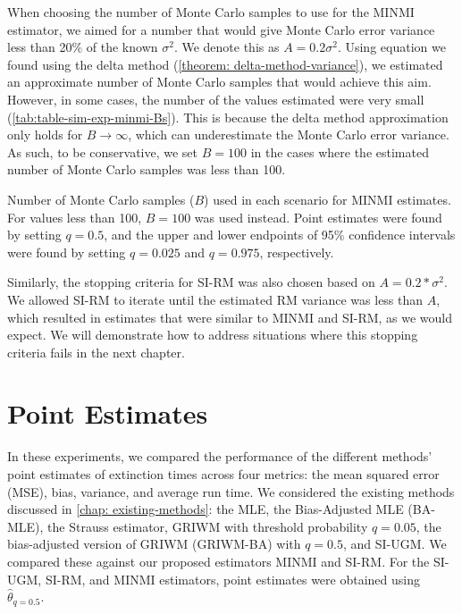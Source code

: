 When choosing the number of Monte Carlo samples to use for the MINMI estimator, we aimed for a number that would give Monte Carlo error variance less than 20\% of the known $\sigma^2$. We denote this as $A = 0.2\sigma^2$. Using equation we found using the delta method (\autoref{theorem: delta-method-variance}), we estimated an approximate number of Monte Carlo samples that would achieve this aim. However, in some cases, the number of the values estimated were very small (\autoref{tab:table-sim-exp-minmi-Bs}). This is because the delta method approximation only holds for $B \rightarrow \infty$, which can underestimate the Monte Carlo error variance. As such, to be conservative, we set $B=100$ in the cases where the estimated number of Monte Carlo samples was less than 100.
\begin{table}[ht]
    \centering
    \caption{Number of Monte Carlo samples ($B$) used in each scenario for MINMI estimates. For values less than 100, $B = 100$ was used instead. Point estimates were found by setting $q = 0.5$, and the upper and lower endpoints of 95\% confidence intervals were found by setting $q=0.025$ and $q=0.975$, respectively.}
    \vspace{4mm}
    
    \label{tab:table-sim-exp-minmi-Bs}
    \vspace{-4mm}
\end{table}

Similarly, the stopping criteria for SI-RM was also chosen based on $A = 0.2*\sigma^2$. We allowed SI-RM to iterate until the estimated RM variance was less than $A$, which resulted in estimates that were similar to MINMI and SI-RM, as we would expect. We will demonstrate how to address situations where this stopping criteria fails in the next chapter.

\section{Point Estimates}

In these experiments, we compared the performance of the different methods' point estimates of extinction times across four metrics: the mean squared error (MSE), bias, variance, and average run time. We considered the existing methods discussed in \autoref{chap: existing-methods}: the MLE, the Bias-Adjusted MLE (BA-MLE), the Strauss estimator, GRIWM with threshold probability $q=0.05$, the bias-adjusted version of GRIWM (GRIWM-BA) with $q=0.5$, and SI-UGM. We compared these against our proposed estimators MINMI and SI-RM. For the SI-UGM, SI-RM, and MINMI estimators, point estimates were obtained using $\hat\theta_{q=0.5}$.

